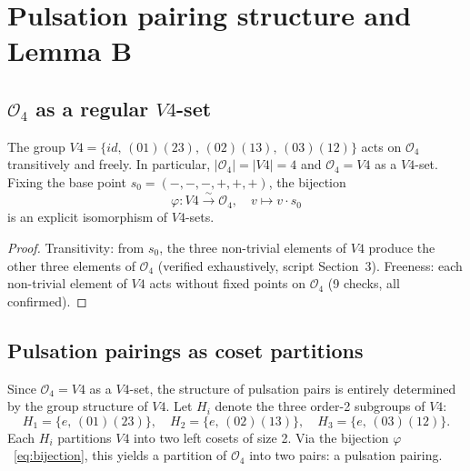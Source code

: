 \documentclass[11pt,a4paper]{article}
\def\Vfour{V4}%
\def\cong{=}%
\def\mathrm#1{#1}%
\newenvironment{lemmabox}[1][]{%
  \begin{tcolorbox}[lemmastyle,title={Lemma\ifx\relax#1\relax\else: #1\fi}]}
  {\end{tcolorbox}}
\theoremstyle{plain}
\theoremstyle{definition}
\theoremstyle{remark}
\newcommand{\Vfour}{V_4}
\newcommand{\Orb}[1]{\mathcal{O}_{#1}}
\begin{document}
\section{Pulsation pairing structure and Lemma B}
\label{sec:lemmaB}

\subsection{\texorpdfstring{$\Orb{4}$}{Orbit-4} as a regular
\texorpdfstring{$\Vfour$}{V4}-set}

\begin{lemmabox}[Regular action of $\Vfour$ on $\Orb{4}$]
\label{lem:regular}
The group $\Vfour = \{\mathrm{id},\,(01)(23),\,(02)(13),\,(03)(12)\}$ acts on $\Orb{4}$
transitively and freely. In particular, $|\Orb{4}| = |\Vfour| = 4$ and $\Orb{4} \cong \Vfour$
as a $\Vfour$-set. Fixing the base point $s_0 = (-,-,-,+,+,+)$, the bijection
\begin{equation}
\varphi : \Vfour \xrightarrow{\;\sim\;} \Orb{4}, \quad v \mapsto v \cdot s_0
\label{eq:bijection}
\end{equation}
is an explicit isomorphism of $\Vfour$-sets.
\end{lemmabox}

\begin{proof}
Transitivity: from $s_0$, the three non-trivial elements of $\Vfour$ produce the other three
elements of $\Orb{4}$ (verified exhaustively, script Section~3). Freeness: each non-trivial
element of $\Vfour$ acts without fixed points on $\Orb{4}$ (9 checks, all confirmed).
\end{proof}

\subsection{Pulsation pairings as coset partitions}

Since $\Orb{4} \cong \Vfour$ as a $\Vfour$-set, the structure of pulsation pairs is
entirely determined by the group structure of $\Vfour$. Let $H_i$ denote the three
order-2 subgroups of $\Vfour$:
\begin{equation}
H_1 = \{e,\,(01)(23)\}, \quad H_2 = \{e,\,(02)(13)\}, \quad H_3 = \{e,\,(03)(12)\}.
\label{eq:Hi}
\end{equation}
Each $H_i$ partitions $\Vfour$ into two left cosets of size 2. Via the bijection
$\varphi$~\eqref{eq:bijection}, this yields a partition of $\Orb{4}$ into two pairs: a
pulsation pairing.
\end{document}
